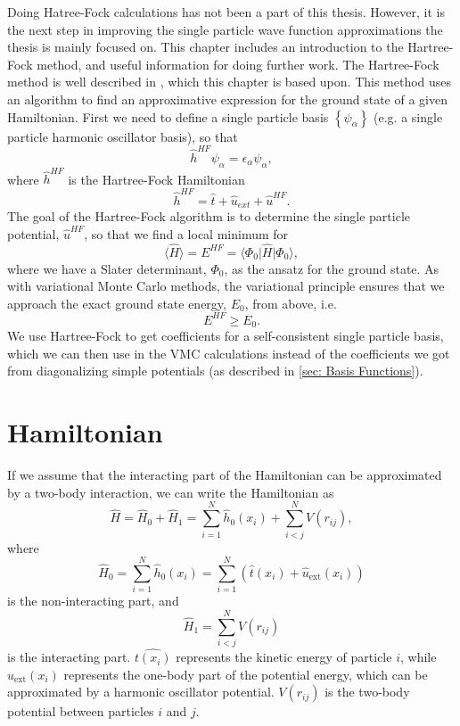 \documentclass[../main.tex]{subfiles}
\begin{document}
Doing Hatree-Fock calculations has not been a part of this thesis. However, it is the next step in improving the single particle wave function approximations the thesis is mainly focused on. This chapter includes an introduction to the Hartree-Fock method, and useful information for doing further work. The Hartree-Fock method is well described in \cite{FYS4411-LectureNotes}, which this chapter is based upon. This method uses an algorithm to find an approximative expression for the ground state of a given Hamiltonian. First we need to define a single particle basis $\left\{\psi_\alpha\right\}$ (e.g. a single particle harmonic oscillator basis), so that 
\begin{equation}
    \hat{h}^{HF}\psi_\alpha = \epsilon_\alpha \psi_\alpha,
\end{equation}
where $\hat{h}^{HF}$ is the Hartree-Fock Hamiltonian
\begin{equation}
    \hat{h}^{HF} = \hat{t} + \hat{u}_{ext} + \hat{u}^{HF}.
\end{equation}
The goal of the Hartree-Fock algorithm is to determine the single particle potential, $\hat{u}^{HF}$, so that we find a local minimum for
\begin{equation}
    \langle \hat{H} \rangle = E^{HF} = \langle \Phi_0 \vert \hat{H} \vert \Phi_0 \rangle,
\end{equation}
where we have a Slater determinant, $\Phi_0$, as the ansatz for the ground state. As with variational Monte Carlo methods, the variational principle ensures that we approach the exact ground state energy, $E_0$, from above, i.e.
\begin{equation}
    E^{HF} \geq E_0.
\end{equation}
We use Hartree-Fock to get coefficients for a self-consistent single particle basis, which we can then use in the VMC calculations instead of the coefficients we got from diagonalizing simple potentials (as described in \ref{sec: Basis Functions}).

\section{Hamiltonian}

If we assume that the interacting part of the Hamiltonian can be approximated by a two-body interaction, we can write the Hamiltonian as
\begin{equation}
    \hat{H} = \hat{H}_0 + \hat{H}_1 = \sum_{i=1}^N \hat{h}_0(x_i) + \sum_{i<j}^N V(r_{ij}),
\end{equation}
where
\begin{equation}
    \hat{H}_0 = \sum_{i=1}^N \hat{h}_0(x_i) = \sum_{i=1}^N \left( \hat{t}(x_i) + \hat{u}_{\textrm{ext}}(x_i) \right)
\end{equation}
is the non-interacting part, and
\begin{equation}
    \hat{H}_1 = \sum_{i<j}^N V(r_{ij})
\end{equation}
is the interacting part. $\hat{t(x_i)}$ represents the kinetic energy of particle $i$, while $\hat{u}_{\textrm{ext}}(x_i)$ represents the one-body part of the potential energy, which can be approximated by a harmonic oscillator potential. $V(r_{ij})$ is the two-body potential between particles $i$ and $j$.
\end{document}
